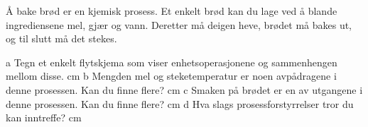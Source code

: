 \documentclass[12pt,a4paper]{article}
\def\oppgave{

		}
\begin{document}
\vskip 5pt 
\vskip 2.5pt 
\oppgave{}%
\vskip 2.5pt 

Å bake brød er en kjemisk prosess. Et enkelt brød kan du lage ved å blande ingrediensene mel, gjær og vann. Deretter må deigen heve, brødet må bakes ut, og til slutt må det stekes.

a Tegn et enkelt flytskjema som viser enhetsoperasjonene og sammenhengen mellom disse.
 cm 
b Mengden mel og steketemperatur er noen avpådragene i denne prosessen. Kan du finne flere?
 cm 
c Smaken på brødet er en av utgangene i denne prosessen. Kan du finne flere?
 cm 
d Hva slags prosessforstyrrelser tror du kan inntreffe?
 cm 

\vskip 5pt 
\vskip 2.5pt 
\end{document}

